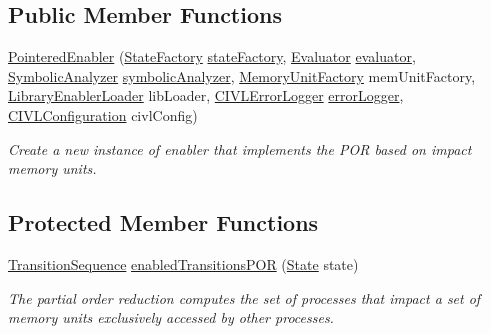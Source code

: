 \subsection*{Public Member Functions}
\begin{DoxyCompactItemize}
\item 
\hyperlink{classedu_1_1udel_1_1cis_1_1vsl_1_1civl_1_1kripke_1_1common_1_1PointeredEnabler_acf3536d488e79c7e2763edec35c18bb0}{Pointered\+Enabler} (\hyperlink{interfaceedu_1_1udel_1_1cis_1_1vsl_1_1civl_1_1state_1_1IF_1_1StateFactory}{State\+Factory} \hyperlink{classedu_1_1udel_1_1cis_1_1vsl_1_1civl_1_1kripke_1_1common_1_1CommonEnabler_ab70b386e8532965202e8b619749b768d}{state\+Factory}, \hyperlink{interfaceedu_1_1udel_1_1cis_1_1vsl_1_1civl_1_1semantics_1_1IF_1_1Evaluator}{Evaluator} \hyperlink{classedu_1_1udel_1_1cis_1_1vsl_1_1civl_1_1kripke_1_1common_1_1CommonEnabler_a9890967584ab748b05714c777aa77940}{evaluator}, \hyperlink{interfaceedu_1_1udel_1_1cis_1_1vsl_1_1civl_1_1semantics_1_1IF_1_1SymbolicAnalyzer}{Symbolic\+Analyzer} \hyperlink{classedu_1_1udel_1_1cis_1_1vsl_1_1civl_1_1kripke_1_1common_1_1CommonEnabler_a7fe830b682c6ef46defd766ebf14c66b}{symbolic\+Analyzer}, \hyperlink{interfaceedu_1_1udel_1_1cis_1_1vsl_1_1civl_1_1state_1_1IF_1_1MemoryUnitFactory}{Memory\+Unit\+Factory} mem\+Unit\+Factory, \hyperlink{interfaceedu_1_1udel_1_1cis_1_1vsl_1_1civl_1_1kripke_1_1IF_1_1LibraryEnablerLoader}{Library\+Enabler\+Loader} lib\+Loader, \hyperlink{classedu_1_1udel_1_1cis_1_1vsl_1_1civl_1_1log_1_1IF_1_1CIVLErrorLogger}{C\+I\+V\+L\+Error\+Logger} \hyperlink{classedu_1_1udel_1_1cis_1_1vsl_1_1civl_1_1kripke_1_1common_1_1CommonEnabler_af13cf4d908776faff26025c88e9f7f6e}{error\+Logger}, \hyperlink{classedu_1_1udel_1_1cis_1_1vsl_1_1civl_1_1config_1_1IF_1_1CIVLConfiguration}{C\+I\+V\+L\+Configuration} civl\+Config)
\begin{DoxyCompactList}\small\item\em Create a new instance of enabler that implements the P\+O\+R based on impact memory units. \end{DoxyCompactList}\end{DoxyCompactItemize}
\subsection*{Protected Member Functions}
\begin{DoxyCompactItemize}
\item 
\hyperlink{interfaceedu_1_1udel_1_1cis_1_1vsl_1_1civl_1_1semantics_1_1IF_1_1TransitionSequence}{Transition\+Sequence} \hyperlink{classedu_1_1udel_1_1cis_1_1vsl_1_1civl_1_1kripke_1_1common_1_1PointeredEnabler_a42cacbd93c2a0be74dcfa6a562e6387f}{enabled\+Transitions\+P\+O\+R} (\hyperlink{interfaceedu_1_1udel_1_1cis_1_1vsl_1_1civl_1_1state_1_1IF_1_1State}{State} state)
\begin{DoxyCompactList}\small\item\em The partial order reduction computes the set of processes that impact a set of memory units exclusively accessed by other processes. \end{DoxyCompactList}\end{DoxyCompactItemize}
